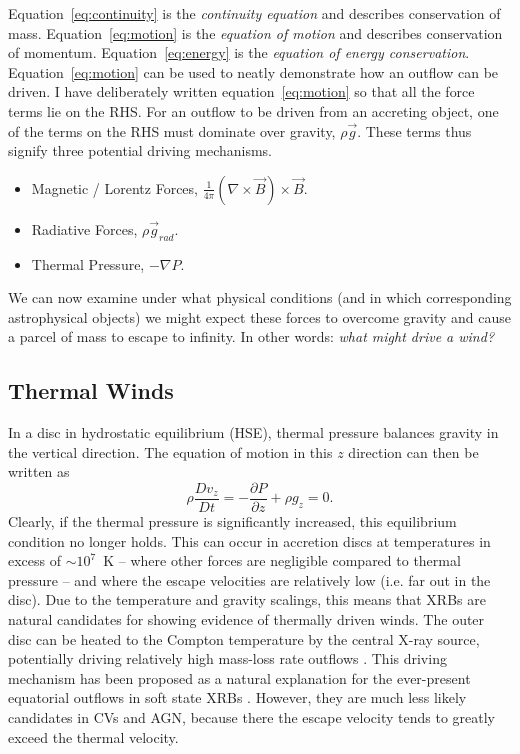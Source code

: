 Equation~\ref{eq:continuity} is the {\em continuity equation} and describes conservation of mass. 
Equation~\ref{eq:motion} is the {\em equation of motion} and describes conservation of momentum.
Equation~\ref{eq:energy} is the {\em equation of energy conservation}. 
Equation~\ref{eq:motion} can be used to neatly demonstrate how an outflow can be driven. I have 
deliberately written equation~\ref{eq:motion} 
so that all the force terms lie on the RHS. 
For an outflow to be driven from an accreting object, one of the terms on the RHS must
dominate over gravity, $\rho \vec{g}$. These terms thus signify three potential
driving mechanisms.

\begin{itemize}
	\item Magnetic / Lorentz Forces, $\frac{1}{4 \pi}(\nabla \times \vec{B}) \times \vec{B}$.
	\item Radiative Forces, $\rho \vec{g}_{rad}$.
	\item Thermal Pressure, $-\nabla P$.
\end{itemize}

We can now examine under what physical conditions 
(and in which corresponding astrophysical objects)
we might expect these forces to overcome gravity and 
cause a parcel of mass to escape to infinity.
In other words: {\em what might drive a wind?}

\subsection{Thermal Winds}
In a disc in hydrostatic equilibrium (HSE), 
thermal pressure balances gravity in the vertical direction. 
The equation of motion in this $z$ direction can then be written as 
\begin{equation}
\label{eq:hse}
\rho \frac{Dv_z}{Dt} = -\frac{\partial P}{\partial z} +  \rho g_z = 0.
\end{equation}
Clearly, if the thermal pressure is significantly 
increased, this equilibrium condition no longer holds. 
This can occur in accretion discs at temperatures in excess of $\sim10^7$~K --
where other forces are negligible compared to thermal pressure -- 
and where the escape velocities are relatively low (i.e. far out in the disc).
Due to the temperature and gravity scalings, this means
that XRBs are natural candidates for showing evidence of thermally driven
winds. The outer disc can be heated to the Compton temperature by 
the central X-ray source,
potentially driving relatively high mass-loss rate outflows 
\citep{begelman1983,woods1996}. 
This driving mechanism has been proposed as a natural explanation
for the ever-present equatorial outflows in soft state XRBs \citep{ponti2012}.
However, they are much less likely candidates in CVs and AGN, because there
the escape velocity tends to greatly exceed the thermal velocity.

